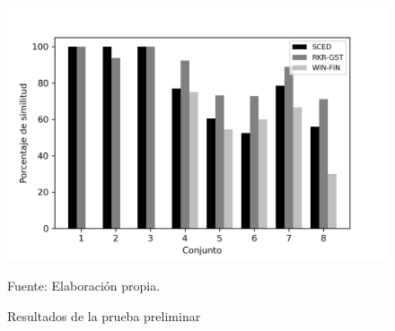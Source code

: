 \begin{figure}[!h]
\centering
\includegraphics[scale=1]{images/results/results_PAIR}
\caption{Resultados de la prueba preliminar}
Fuente: Elaboración propia.
\label{set_Pre}
\end{figure}
